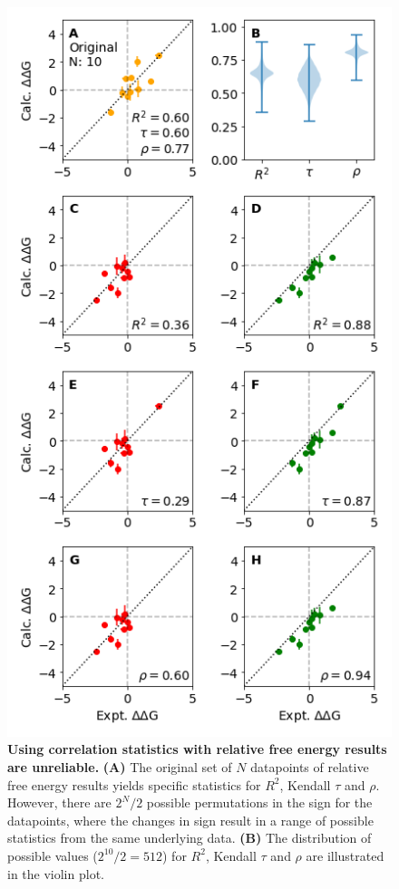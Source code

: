 \documentclass[9pt,bestpractices]{livecoms}
\begin{document}
\begin{figure}
    \includegraphics[width=0.95\linewidth]{figures/reporting/relativeissues.png}
    \caption{\textbf{Using correlation statistics with relative free energy results are unreliable.} 
    \textbf{(A)} The original set of $N$ datapoints of relative free energy results yields specific statistics for $R^2$, Kendall $\tau$ and $\rho$. However, there are $2^N/2$ possible permutations in the sign for the datapoints, where the changes in sign result in a range of possible statistics from the same underlying data. \textbf{(B)} The distribution of possible values ($2^{10}/2 = 512$) for $R^2$, Kendall $\tau$ and $\rho$ are illustrated in the violin plot. 
}
\end{figure}
\end{document}
